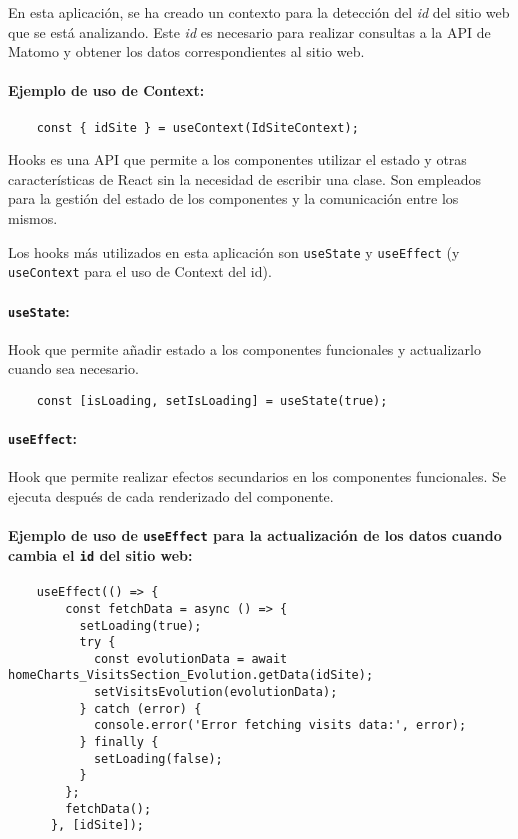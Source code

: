 En esta aplicación, se ha creado un contexto para la detección del \textit{id} del sitio web que se está analizando. Este \textit{id} 
es necesario para realizar consultas a la API de Matomo y obtener los datos correspondientes al sitio web.

\paragraph{Ejemplo de uso de Context:}   
\begin{verbatim}
    const { idSite } = useContext(IdSiteContext);
\end{verbatim}

Hooks es una API que permite a los componentes utilizar el estado y otras características de React sin la necesidad de escribir 
una clase. Son empleados para la gestión del estado de los componentes y la comunicación entre los mismos.

Los hooks más utilizados en esta aplicación son \texttt{useState} y \texttt{useEffect} (y \texttt{useContext} para el uso de Context del id).

\paragraph{\texttt{useState}:} Hook que permite añadir estado a los componentes funcionales y actualizarlo cuando sea necesario.
\begin{verbatim}
    const [isLoading, setIsLoading] = useState(true);
\end{verbatim}

\paragraph{\texttt{useEffect}:} Hook que permite realizar efectos secundarios en los componentes funcionales. Se ejecuta después 
de cada renderizado del componente.

\paragraph{Ejemplo de uso de \texttt{useEffect} para la actualización de los datos cuando cambia el \texttt{id} del sitio web:}
\begin{verbatim}
    useEffect(() => {
        const fetchData = async () => {
          setLoading(true);
          try {
            const evolutionData = await homeCharts_VisitsSection_Evolution.getData(idSite); 
            setVisitsEvolution(evolutionData);
          } catch (error) {
            console.error('Error fetching visits data:', error);
          } finally {
            setLoading(false);
          }
        };
        fetchData();
      }, [idSite]);
\end{verbatim}

